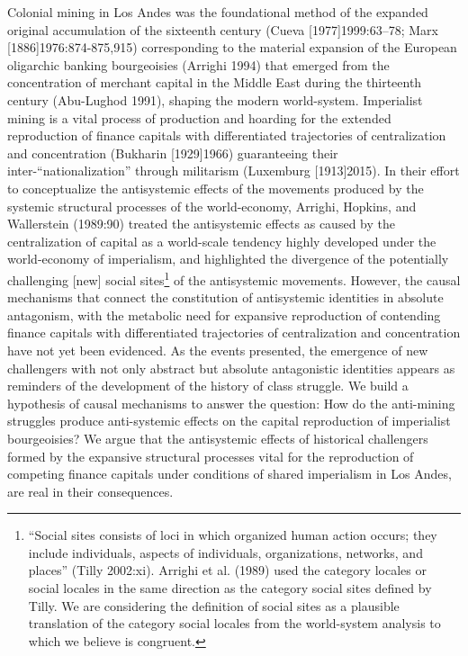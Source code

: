 \documentclass[]{interact}
\theoremstyle{plain}%
\theoremstyle{definition}
\theoremstyle{remark}
\begin{document}
Colonial mining in Los Andes was the foundational method of the expanded original accumulation of the sixteenth century (Cueva [1977]1999:63–78; Marx [1886]1976:874-875,915) corresponding to the material expansion of the European oligarchic banking bourgeoisies (Arrighi 1994) that emerged from the concentration of merchant capital in the Middle East during the thirteenth century (Abu-Lughod 1991), shaping the modern world-system. Imperialist mining is a vital process of production and hoarding for the extended reproduction of finance capitals with differentiated trajectories of centralization and concentration (Bukharin [1929]1966) guaranteeing their inter-“nationalization” through militarism (Luxemburg [1913]2015).
In their effort to conceptualize the antisystemic effects of the movements produced by the systemic structural processes of the world-economy, Arrighi, Hopkins, and Wallerstein (1989:90) treated the antisystemic effects as caused by the centralization of capital as a world-scale tendency highly developed under the world-economy of imperialism, and highlighted the divergence of the potentially challenging [new] social sites\footnote{“Social sites consists of loci in which organized human action occurs; they include individuals, aspects of individuals, organizations, networks, and places” (Tilly 2002:xi). Arrighi et al. (1989) used the category locales or social locales in the same direction as the category social sites defined by Tilly. We are considering the definition of social sites as a plausible translation of the category social locales from the world-system analysis to which we believe is congruent.} of the antisystemic movements. However, the causal mechanisms that connect the constitution of antisystemic identities in absolute antagonism, with the metabolic need for expansive reproduction of contending finance capitals with differentiated trajectories of centralization and concentration have not yet been evidenced.
As the events presented, the emergence of new challengers with not only abstract but absolute antagonistic identities appears as reminders of the development of the history of class struggle. We build a hypothesis of causal mechanisms to answer the question: How do the anti-mining struggles produce anti-systemic effects on the capital reproduction of imperialist bourgeoisies? We argue that the antisystemic effects of historical challengers formed by the expansive structural processes vital for the reproduction of competing finance capitals under conditions of shared imperialism in Los Andes, are real in their consequences.
\end{document}
